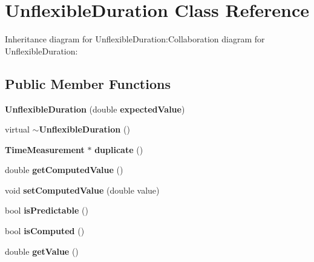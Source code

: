 \section{UnflexibleDuration Class Reference}
\label{classbr_1_1pucrio_1_1telemidia_1_1ginga_1_1ncl_1_1model_1_1time_1_1UnflexibleDuration}
Inheritance diagram for UnflexibleDuration:Collaboration diagram for UnflexibleDuration:\subsection*{Public Member Functions}
\begin{CompactItemize}
\item 
\textbf{UnflexibleDuration} (double {\bf expectedValue})\label{classbr_1_1pucrio_1_1telemidia_1_1ginga_1_1ncl_1_1model_1_1time_1_1UnflexibleDuration_cf1f60cf37d845d71450a17a4f603607}

\item 
virtual {\bf $\sim$UnflexibleDuration} ()\label{classbr_1_1pucrio_1_1telemidia_1_1ginga_1_1ncl_1_1model_1_1time_1_1UnflexibleDuration_0fee60af234e8be1fce51971dd35686f}

\item 
{\bf TimeMeasurement} $\ast$ \textbf{duplicate} ()\label{classbr_1_1pucrio_1_1telemidia_1_1ginga_1_1ncl_1_1model_1_1time_1_1UnflexibleDuration_b9566409330fc24ebd73cbccd476c3fa}

\item 
double {\bf getComputedValue} ()\label{classbr_1_1pucrio_1_1telemidia_1_1ginga_1_1ncl_1_1model_1_1time_1_1UnflexibleDuration_966aa0047383ec75510c87d32b38ce73}

\item 
void {\bf setComputedValue} (double value)\label{classbr_1_1pucrio_1_1telemidia_1_1ginga_1_1ncl_1_1model_1_1time_1_1UnflexibleDuration_9a13233ccee82a95c0f8f3875f2c174d}

\item 
bool {\bf isPredictable} ()\label{classbr_1_1pucrio_1_1telemidia_1_1ginga_1_1ncl_1_1model_1_1time_1_1UnflexibleDuration_e557ed36739041ecbdfb9937a6f88275}

\item 
bool {\bf isComputed} ()\label{classbr_1_1pucrio_1_1telemidia_1_1ginga_1_1ncl_1_1model_1_1time_1_1UnflexibleDuration_2c228ee793385ffb05f9acfd22bb482c}

\item 
double {\bf getValue} ()\label{classbr_1_1pucrio_1_1telemidia_1_1ginga_1_1ncl_1_1model_1_1time_1_1UnflexibleDuration_666f992950731c68de1ad441f80f228c}

\end{CompactItemize}
